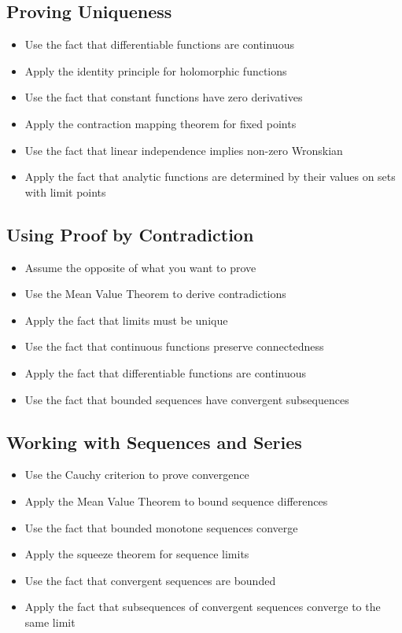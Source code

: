 \subsection*{Proving Uniqueness}
\begin{itemize}
\item Use the fact that differentiable functions are continuous
\item Apply the identity principle for holomorphic functions
\item Use the fact that constant functions have zero derivatives
\item Apply the contraction mapping theorem for fixed points
\item Use the fact that linear independence implies non-zero Wronskian
\item Apply the fact that analytic functions are determined by their values on sets with limit points
\end{itemize}

\subsection*{Using Proof by Contradiction}
\begin{itemize}
\item Assume the opposite of what you want to prove
\item Use the Mean Value Theorem to derive contradictions
\item Apply the fact that limits must be unique
\item Use the fact that continuous functions preserve connectedness
\item Apply the fact that differentiable functions are continuous
\item Use the fact that bounded sequences have convergent subsequences
\end{itemize}

\subsection*{Working with Sequences and Series}
\begin{itemize}
\item Use the Cauchy criterion to prove convergence
\item Apply the Mean Value Theorem to bound sequence differences
\item Use the fact that bounded monotone sequences converge
\item Apply the squeeze theorem for sequence limits
\item Use the fact that convergent sequences are bounded
\item Apply the fact that subsequences of convergent sequences converge to the same limit
\end{itemize}

